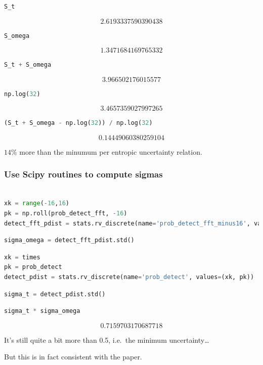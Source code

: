 \begin{lstlisting}[language=Python]
S_t
\end{lstlisting}

\[2.6193337590390438\]

\begin{lstlisting}[language=Python]
S_omega
\end{lstlisting}

\[1.3471684169765332\]

\begin{lstlisting}[language=Python]
S_t + S_omega
\end{lstlisting}

\[3.966502176015577\]

\begin{lstlisting}[language=Python]
np.log(32)
\end{lstlisting}

\[3.4657359027997265\]

\begin{lstlisting}[language=Python]
(S_t + S_omega - np.log(32)) / np.log(32)
\end{lstlisting}

\[0.14449060380259104\]

$14\%$ more than the minumum per entropic uncertainty relation.

\hypertarget{use-scipy-routines-to-compute-sigmas}{%
\subsubsection{Use Scipy routines to compute
sigmas}\label{use-scipy-routines-to-compute-sigmas}}

\begin{lstlisting}[language=Python]

xk = range(-16,16)
pk = np.roll(prob_detect_fft, -16)
detect_fft_pdist = stats.rv_discrete(name='prob_detect_fft_minus16', values=(xk, pk))
\end{lstlisting}

\begin{lstlisting}[language=Python]
sigma_omega = detect_fft_pdist.std()
\end{lstlisting}

\begin{lstlisting}[language=Python]
xk = times
pk = prob_detect
detect_pdist = stats.rv_discrete(name='prob_detect', values=(xk, pk))
\end{lstlisting}

\begin{lstlisting}[language=Python]
sigma_t = detect_pdist.std()
\end{lstlisting}

\begin{lstlisting}[language=Python]
sigma_t * sigma_omega
\end{lstlisting}

\[0.7159703170687718\]

It's still quite a bit more than 0.5, i.e.~the minimum
uncertainty\ldots{}

But this is in fact consistent with the paper.
